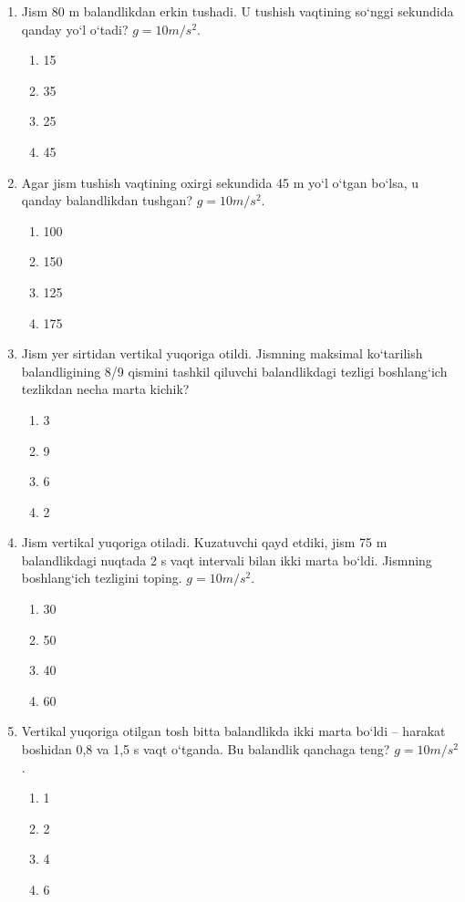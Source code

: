 \begin{enumerate}
\item Jism 80 m balandlikdan erkin tushadi. U tushish vaqtining so‘nggi sekundida qanday yo‘l o‘tadi? $g=10 m/s^2$.
\begin{enumerate}[label=\Alph*)]
\item 15
\item 35
\item 25
\item 45
\end{enumerate}

\item Agar jism tushish vaqtining oxirgi sekundida 45 m yo‘l o‘tgan bo‘lsa, u qanday balandlikdan tushgan? $g=10 m/s^2$.
\begin{enumerate}[label=\Alph*)]
\item 100
\item 150
\item 125
\item 175
\end{enumerate}

\item Jism yer sirtidan vertikal yuqoriga otildi. Jismning maksimal ko‘tarilish balandligining 8/9 qismini tashkil qiluvchi balandlikdagi tezligi boshlang‘ich tezlikdan necha marta kichik?
\begin{enumerate}[label=\Alph*)]
\item 3
\item 9
\item 6
\item 2
\end{enumerate}

\item Jism vertikal yuqoriga otiladi. Kuzatuvchi qayd etdiki, jism 75 m balandlikdagi nuqtada 2 s vaqt intervali bilan ikki marta bo‘ldi. Jismning boshlang‘ich tezligini toping. $g=10 m/s^2$.
\begin{enumerate}[label=\Alph*)]
\item 30
\item 50
\item 40
\item 60
\end{enumerate}

\item Vertikal yuqoriga otilgan tosh bitta balandlikda ikki marta bo‘ldi – harakat boshidan 0,8 va 1,5 s vaqt o‘tganda. Bu balandlik qanchaga teng? $g=10 m/s^2$.
\begin{enumerate}[label=\Alph*)]
\item 1
\item 2
\item 4
\item 6
\end{enumerate}


\end{enumerate}
